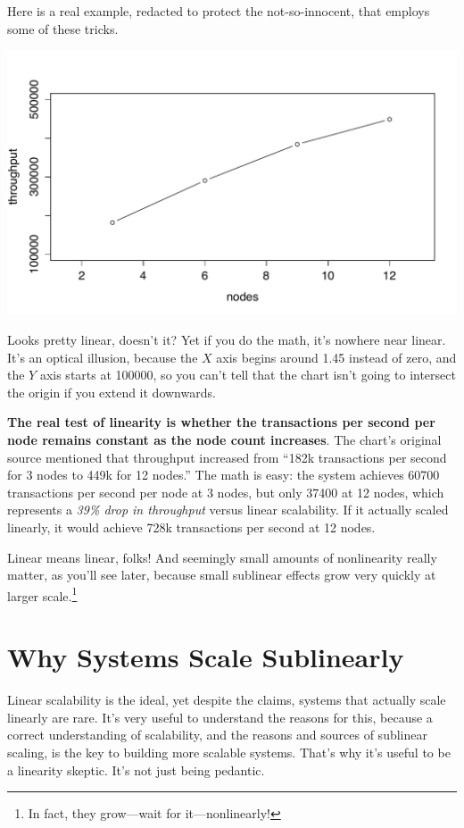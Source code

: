 \documentclass{vivid_layout}
\begin{document}
Here is a real example, redacted to protect the not-so-innocent, that employs
some of these tricks.
\begin{center}
\includegraphics[width=.85\linewidth]{scalability/voltdb1}
\end{center}
Looks pretty linear, doesn't it? Yet if you do the math, it's nowhere near
linear.  It's an optical illusion, because the $X$ axis begins around
1.45 instead of zero, and the $Y$ axis starts at 100000, so you can't tell that
the chart isn't going to intersect the origin if you extend it downwards.

{\bfseries The real test of linearity is whether the transactions per second per
node remains constant as the node count increases}. The chart's original source
mentioned that throughput increased from ``182k transactions per second for 3
nodes to 449k for 12 nodes.'' The math is easy: the system achieves 60700
transactions per second per node at 3 nodes, but only 37400 at 12 nodes, which
represents a {\itshape 39\% drop in throughput} versus linear scalability.  If
it actually scaled linearly, it would achieve 728k transactions per second at 12
nodes.

Linear means linear, folks! And seemingly small amounts of nonlinearity really
matter, as you'll see later, because small sublinear effects grow very quickly
at larger scale.\footnote{In fact, they grow---wait for it---nonlinearly!}

\section{Why Systems Scale Sublinearly}

Linear scalability is the ideal, yet despite the claims, systems that actually
scale linearly are rare.  It's very useful to understand the reasons for this,
because a correct understanding of scalability, and the reasons and sources of
sublinear scaling, is the key to building more scalable systems.  That's why
it's useful to be a linearity skeptic.  It's not just being pedantic.
\end{document}
